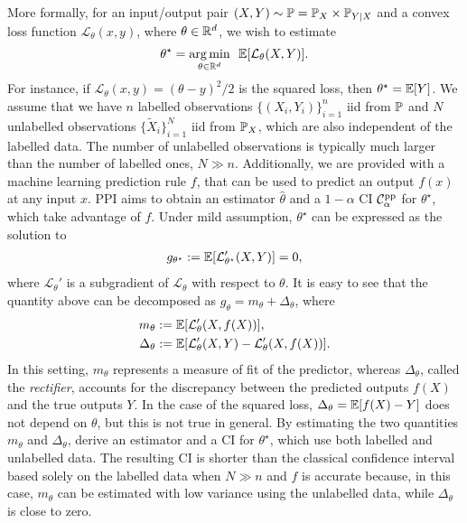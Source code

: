More formally, for an input/output pair $(X,Y)\sim \mathbb P=\mathbb P_X\times\mathbb P_{Y|X}$ and a convex loss function $\mathcal{L}_\theta(x,y)$, where $\theta\in\mathbb R^d$, we wish to estimate
\begin{align}
    \theta^\star=\underset{\theta\in\mathbb R^d}{\arg\min}~~\mathbb E[\mathcal{L}_\theta(X,Y)]. \label{eq:defthetastar1}
\end{align}
For instance, if $\mathcal{L}_\theta(x,y)=(\theta - y)^2/2$ is the squared loss, then $\theta^\star=\mathbb E[Y]$.
We assume that we have $n$ labelled observations $\{(X_i,Y_i)\}_{i=1}^n$ iid from $\mathbb P$ and $N$ unlabelled observations $\{\widetilde X_{i}\}_{i=1}^N$ iid from $\mathbb P_X$, which are also independent of the labelled data. The number of unlabelled observations is typically much larger than the number of labelled ones, $N\gg n$. Additionally, we are provided with a machine learning prediction rule $f$, that can be used to predict an output $f(x)$ at any input $x$. PPI aims to obtain an estimator $\widehat \theta$ and a $1-\alpha$ CI $\mathcal C_\alpha^{\mathrm{pp}}$ for $\theta^\star$, which take advantage of $f$. Under mild assumption, $\theta^\star$ can be expressed as the solution to 
\begin{align}
    g_{\theta^\star}:=\mathbb E[\mathcal{L}_{\theta^\star}'(X,Y)]=0, \label{eq:defthetastar2}
\end{align}
where $\mathcal{L}_\theta'$ is a subgradient of $\mathcal{L}_\theta$ with respect to $\theta$. It is easy to see that the quantity above can be decomposed as $g_{\theta} = m_\theta + \Delta_\theta$, where 
\begin{align}
    m_\theta&:=\mathbb E[\mathcal{L}_{\theta}'(X,f(X))], \label{eq:m_theta} \\
    \Delta_\theta&:=\mathbb E[\mathcal{L}_{\theta}'(X,Y)-\mathcal{L}_{\theta}'(X,f(X))] \label{eq:Delta_theta}.
\end{align}
In this setting, $m_\theta$ represents a measure of fit of the predictor, whereas $\Delta_\theta$, called the \textit{rectifier}, accounts for the discrepancy between the predicted outputs $f(X)$ and the true outputs $Y$.
In the case of the squared loss, $\Delta_\theta=\mathbb E[f(X)-Y]$ does not depend on $\theta$, but this is not true in general.
By estimating the two quantities $m_\theta$ and $\Delta_\theta$, \citet{Angelopoulos2023a} derive an estimator and a CI for $\theta^\star$, which use both labelled and unlabelled data. The resulting CI is shorter than the classical confidence interval based solely on the labelled data when $N \gg n$ and $f$ is accurate because, in this case, $m_\theta$ can be estimated with low variance using the unlabelled data, while $\Delta_\theta$ is close to zero.

